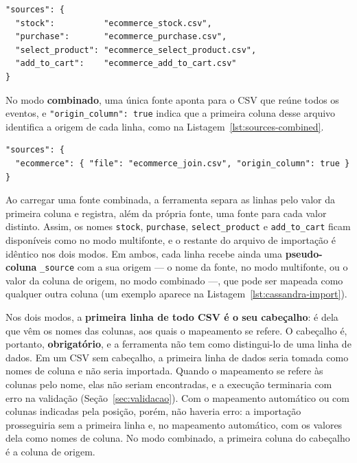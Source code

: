 \begin{lstlisting}[style=jsonstyle,caption={Bloco \texttt{sources} no modo multifonte (um CSV por conjunto de dados).},label={lst:sources-multi}]
"sources": {
  "stock":          "ecommerce_stock.csv",
  "purchase":       "ecommerce_purchase.csv",
  "select_product": "ecommerce_select_product.csv",
  "add_to_cart":    "ecommerce_add_to_cart.csv"
}
\end{lstlisting}

No modo \textbf{combinado}, uma única fonte aponta para o CSV que reúne todos os eventos, e
\texttt{"origin\_column": true} indica que a primeira coluna desse arquivo identifica a
origem de cada linha, como na Listagem~\ref{lst:sources-combined}.

\begin{lstlisting}[style=jsonstyle,caption={Bloco \texttt{sources} no modo combinado (um CSV com coluna de origem).},label={lst:sources-combined}]
"sources": {
  "ecommerce": { "file": "ecommerce_join.csv", "origin_column": true }
}
\end{lstlisting}

Ao carregar uma fonte combinada, a ferramenta separa as linhas pelo valor da primeira
coluna e registra, além da própria fonte, uma fonte para cada valor distinto. Assim, os
nomes \texttt{stock}, \texttt{purchase}, \texttt{select\_product} e \texttt{add\_to\_cart}
ficam disponíveis como no modo multifonte, e o restante do arquivo de importação é
idêntico nos dois modos. Em ambos, cada linha recebe ainda uma \textbf{pseudo-coluna}
\texttt{\_source} com a sua origem --- o nome da fonte, no modo multifonte, ou o valor da
coluna de origem, no modo combinado ---, que pode ser mapeada como qualquer outra
coluna (um exemplo aparece na Listagem~\ref{lst:cassandra-import}).

Nos dois modos, a \textbf{primeira linha de todo CSV é o seu cabeçalho}: é dela que vêm
os nomes das colunas, aos quais o mapeamento se refere. O cabeçalho é, portanto,
\textbf{obrigatório}, e a ferramenta não tem como distingui-lo de uma linha de dados. Em
um CSV sem cabeçalho, a primeira linha de dados seria tomada como nomes de coluna e não
seria importada. Quando o mapeamento se refere às colunas pelo nome, elas não seriam
encontradas, e a execução terminaria com erro na validação (Seção~\ref{sec:validacao}).
Com o mapeamento automático ou com colunas indicadas pela posição, porém, não haveria
erro: a importação prosseguiria sem a primeira linha e, no mapeamento automático, com os
valores dela como nomes de coluna. No modo combinado, a
primeira coluna do cabeçalho é a coluna de origem.


